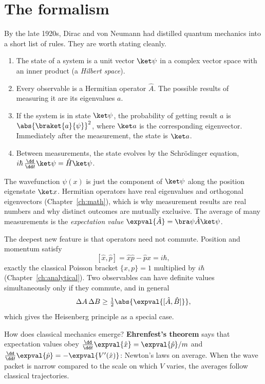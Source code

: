 \section{The formalism}
\label{sec:formalism}

By the late 1920s, Dirac and von Neumann had distilled quantum mechanics into a short list of rules. They are worth stating cleanly.

\begin{law}
\begin{enumerate}[label=(\arabic*),itemsep=3pt]
  \item The state of a system is a unit vector $\ket\psi$ in a complex vector space with an inner product (a \emph{Hilbert space}).
  \item Every observable is a Hermitian operator $\hat A$. The possible results of measuring it are its eigenvalues $a$.
  \item If the system is in state $\ket\psi$, the probability of getting result $a$ is $\abs{\braket{a}{\psi}}^2$, where $\ket a$ is the corresponding eigenvector. Immediately after the measurement, the state is $\ket a$.
  \item Between measurements, the state evolves by the Schr\"odinger equation, $i\hbar\,\tfrac{\dd}{\dd t}\ket\psi = \hat H\ket\psi$.
\end{enumerate}
\end{law}

The wavefunction $\psi(x)$ is just the component of $\ket\psi$ along the position eigenstate $\ket x$. Hermitian operators have real eigenvalues and orthogonal eigenvectors (Chapter~\ref{ch:math}), which is why measurement results are real numbers and why distinct outcomes are mutually exclusive. The average of many measurements is the \emph{expectation value} $\expval{\hat A} = \bra\psi\hat A\ket\psi$.

The deepest new feature is that operators need not commute. Position and momentum satisfy
\[
  [\hat x,\hat p] = \hat x\hat p - \hat p\hat x = i\hbar,
\]
exactly the classical Poisson bracket $\{x,p\} = 1$ multiplied by $i\hbar$ (Chapter~\ref{ch:analytical}). Two observables can have definite values simultaneously only if they commute, and in general
\[
  \Delta A\,\Delta B\ge\tfrac12\abs{\expval{[\hat A,\hat B]}},
\]
which gives the Heisenberg principle as a special case.

How does classical mechanics emerge? \textbf{Ehrenfest's theorem} says that expectation values obey $\tfrac{\dd}{\dd t}\expval{\hat x} = \expval{\hat p}/m$ and $\tfrac{\dd}{\dd t}\expval{\hat p} = -\expval{V'(\hat x)}$: Newton's laws on average. When the wave packet is narrow compared to the scale on which $V$ varies, the averages follow classical trajectories.

